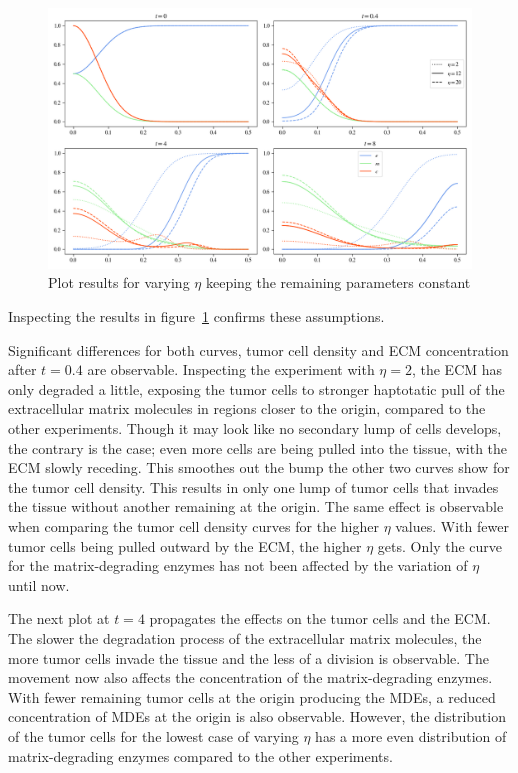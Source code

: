 \begin{figure}[h!]
 \centering
 \includegraphics[width=\textwidth]{resources/images/eta_variation.png}
 \caption{Plot results for varying $\eta$ keeping the remaining parameters constant}
 \label{fig:eta_variation}
\end{figure}
Inspecting the results in figure~\ref{fig:eta_variation} confirms these assumptions.

Significant differences for both curves, tumor cell density and ECM concentration after $t=0.4$ are observable. Inspecting the experiment with $\eta=2$, the ECM has only degraded a little, exposing the tumor cells to stronger haptotatic pull of the extracellular matrix molecules in regions closer to the origin, compared to the other experiments. Though it may look like no secondary lump of cells develops, the contrary is the case; even more cells are being pulled into the tissue, with the ECM slowly receding. This smoothes out the bump the other two curves show for the tumor cell density. This results in only one lump of tumor cells that invades the tissue without another remaining at the origin. The same effect is observable when comparing the tumor cell density curves for the higher $\eta$ values. With fewer tumor cells being pulled outward by the ECM, the higher $\eta$ gets. Only the curve for the matrix-degrading enzymes has not been affected by the variation of $\eta$ until now.

The next plot at $t=4$ propagates the effects on the tumor cells and the ECM. The slower the degradation process of the extracellular matrix molecules, the more tumor cells invade the tissue and the less of a division is observable. The movement now also affects the concentration of the matrix-degrading enzymes. With fewer remaining tumor cells at the origin producing the MDEs, a reduced concentration of MDEs at the origin is also observable. However, the distribution of the tumor cells for the lowest case of varying $\eta$ has a more even distribution of matrix-degrading enzymes compared to the other experiments.

